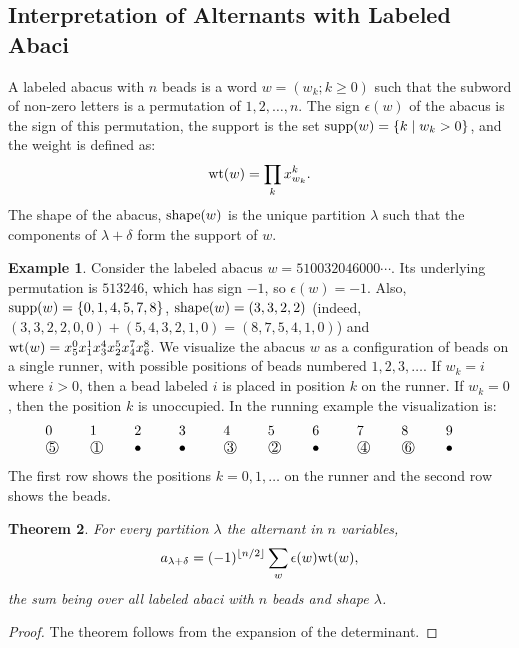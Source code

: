\documentclass[11pt]{amsart}
\newtheorem{theorem}{Theorem}[subsection]
\theoremstyle{definition}
\theoremstyle{example}
\newtheorem{example}[theorem]{Example}
\newcommand{\supp}{\textup{supp}}
\newcommand{\wt}{\textup{wt}}
\newcommand{\shape}{\textup{shape}}
\renewcommand{\circled}[1]{\raisebox{.5pt}{\textcircled{\raisebox{-.9pt} {#1}}}}
\begin{document}
\subsection{Interpretation of Alternants with Labeled Abaci}
\label{sec:abaci}
A labeled abacus with $n$ beads is a word $w=(w_k; k\geq 0)$ such that the subword of non-zero letters is a permutation of $1,2,\dotsc,n$.
The sign $\epsilon(w)$ of the abacus is the sign of this permutation, the support is the set $\supp(w)=\{k\mid w_k>0\}$, and the weight is defined as:
\begin{displaymath}
  \wt(w) = \prod_k x_{w_k}^k.
\end{displaymath}
The shape of the abacus, $\shape(w)$ is the unique partition $\lambda$ such that the components of $\lambda+\delta$ form the support of $w$.
\begin{example}
  Consider the labeled abacus $w=510032046000\dotsb$.
  Its underlying permutation is $513246$, which has sign $-1$, so $\epsilon(w)=-1$.
  Also, $\supp(w)=\{0,1,4,5,7,8\}$, $\shape(w)=(3,3,2,2)$ (indeed, $(3,3,2,2,0,0)+(5,4,3,2,1,0)=(8,7,5,4,1,0)$) and $\wt(w)=x_5^0x_1^1x_3^4x_2^5x_4^7x_6^8$.
  We visualize the abacus $w$ as a configuration of beads on a single runner, with possible positions of beads numbered $1, 2, 3, \dotsc$.
  If $w_k=i$ where $i>0$, then a bead labeled $i$ is placed in position $k$ on the runner.
  If $w_k=0$, then the position $k$ is unoccupied.
  In the running example the visualization is:
  \begin{displaymath}
    \begin{tabular}{*{10}{p{0.7cm}}}
      0 & 1 & 2 & 3 & 4 & 5 & 6 & 7 & 8 & 9\\
      \circled{5} & \circled{1} & $\bullet$ & $\bullet$ & \circled{3} & \circled{2} & $\bullet$ & \circled{4} & \circled{6} & $\bullet$
    \end{tabular}
  \end{displaymath}
  The first row shows the positions $k=0,1,\dotsc$ on the runner and the second row shows the beads.
\end{example}
\begin{theorem}
  \label{theorem:abacus-alt}
  For every partition $\lambda$ the alternant in $n$  variables,
  \begin{displaymath}
    a_{\lambda+\delta} = (-1)^{\lfloor n/2\rfloor} \sum_w \epsilon(w)\wt(w),
  \end{displaymath}
  the sum being over all labeled abaci with $n$ beads and shape $\lambda$.
\end{theorem}
\begin{proof}
  The theorem follows from the expansion of the determinant.
\end{proof}
\end{document}
